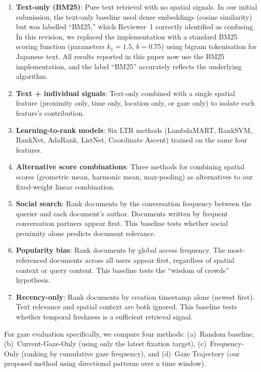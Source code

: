 \documentclass[journal]{IEEEtran}
\begin{document}
\begin{enumerate}
  \item \textbf{Text-only (BM25)}: Pure text retrieval with no spatial signals.  In our initial submission, the text-only baseline used dense embeddings (cosine similarity) but was labelled ``BM25,'' which Reviewer~1 correctly identified as confusing.  In this revision, we replaced the implementation with a standard BM25 scoring function (parameters $k_1{=}1.5$, $b{=}0.75$) using bigram tokenisation for Japanese text.  All results reported in this paper now use the BM25 implementation, and the label ``BM25'' accurately reflects the underlying algorithm.
  \item \textbf{Text + individual signals}: Text-only combined with a single spatial feature (proximity only, time only, location only, or gaze only) to isolate each feature's contribution.
  \item \textbf{Learning-to-rank models}: Six LTR methods (LambdaMART, RankSVM, RankNet, AdaRank, ListNet, Coordinate Ascent) trained on the same four features.
  \item \textbf{Alternative score combinations}: Three methods for combining spatial scores (geometric mean, harmonic mean, max-pooling) as alternatives to our fixed-weight linear combination.
  \item \textbf{Social search}: Rank documents by the conversation
    frequency between the querier and each document's author.
    Documents written by frequent conversation partners appear first.
    This baseline tests whether social proximity alone predicts
    document relevance.
  \item \textbf{Popularity bias}: Rank documents by global access
    frequency. The most-referenced documents across all users appear
    first, regardless of spatial context or query content. This
    baseline tests the ``wisdom of crowds'' hypothesis.
  \item \textbf{Recency-only}: Rank documents by creation timestamp
    alone (newest first). Text relevance and spatial context are
    both ignored. This baseline tests whether temporal freshness
    is a sufficient retrieval signal.
\end{enumerate}

For gaze evaluation specifically, we compare four methods: (a)~Random baseline, (b)~Current-Gaze-Only (using only the latest fixation target), (c)~Frequency-Only (ranking by cumulative gaze frequency), and (d)~Gaze Trajectory (our proposed method using directional patterns over a time window).
\end{document}

